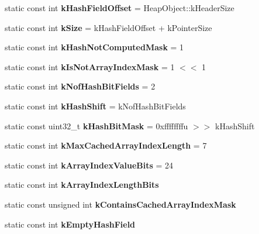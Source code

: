 \begin{DoxyCompactItemize}
\item 
\hypertarget{classv8_1_1internal_1_1_name_a6470e0e9daf944b4cd9bfff26aebb031}{}static const int {\bfseries k\+Hash\+Field\+Offset} = Heap\+Object\+::k\+Header\+Size\label{classv8_1_1internal_1_1_name_a6470e0e9daf944b4cd9bfff26aebb031}

\item 
\hypertarget{classv8_1_1internal_1_1_name_a5009ca3e9ba3933dd9844e6e0b3d5ed7}{}static const int {\bfseries k\+Size} = k\+Hash\+Field\+Offset + k\+Pointer\+Size\label{classv8_1_1internal_1_1_name_a5009ca3e9ba3933dd9844e6e0b3d5ed7}

\item 
\hypertarget{classv8_1_1internal_1_1_name_a6379c93f471c1fb21182d903fa4dff79}{}static const int {\bfseries k\+Hash\+Not\+Computed\+Mask} = 1\label{classv8_1_1internal_1_1_name_a6379c93f471c1fb21182d903fa4dff79}

\item 
\hypertarget{classv8_1_1internal_1_1_name_a9b9885f1eea305e5b9a83946791cad48}{}static const int {\bfseries k\+Is\+Not\+Array\+Index\+Mask} = 1 $<$$<$ 1\label{classv8_1_1internal_1_1_name_a9b9885f1eea305e5b9a83946791cad48}

\item 
\hypertarget{classv8_1_1internal_1_1_name_ab0662a44175aad38e3e5665109598155}{}static const int {\bfseries k\+Nof\+Hash\+Bit\+Fields} = 2\label{classv8_1_1internal_1_1_name_ab0662a44175aad38e3e5665109598155}

\item 
\hypertarget{classv8_1_1internal_1_1_name_a155b0b4b5fe46062d9171d2493a59e1f}{}static const int {\bfseries k\+Hash\+Shift} = k\+Nof\+Hash\+Bit\+Fields\label{classv8_1_1internal_1_1_name_a155b0b4b5fe46062d9171d2493a59e1f}

\item 
\hypertarget{classv8_1_1internal_1_1_name_a9b592cfd6109e2831514bbde5d0aaea3}{}static const uint32\+\_\+t {\bfseries k\+Hash\+Bit\+Mask} = 0xffffffffu $>$$>$ k\+Hash\+Shift\label{classv8_1_1internal_1_1_name_a9b592cfd6109e2831514bbde5d0aaea3}

\item 
\hypertarget{classv8_1_1internal_1_1_name_a29a07cb2ebdab579a278a6891edfdcae}{}static const int {\bfseries k\+Max\+Cached\+Array\+Index\+Length} = 7\label{classv8_1_1internal_1_1_name_a29a07cb2ebdab579a278a6891edfdcae}

\item 
\hypertarget{classv8_1_1internal_1_1_name_ac253c758f54e8ac0708b4b647ebbe9f8}{}static const int {\bfseries k\+Array\+Index\+Value\+Bits} = 24\label{classv8_1_1internal_1_1_name_ac253c758f54e8ac0708b4b647ebbe9f8}

\item 
static const int {\bfseries k\+Array\+Index\+Length\+Bits}
\item 
static const unsigned int {\bfseries k\+Contains\+Cached\+Array\+Index\+Mask}
\item 
static const int {\bfseries k\+Empty\+Hash\+Field}
\end{DoxyCompactItemize}
